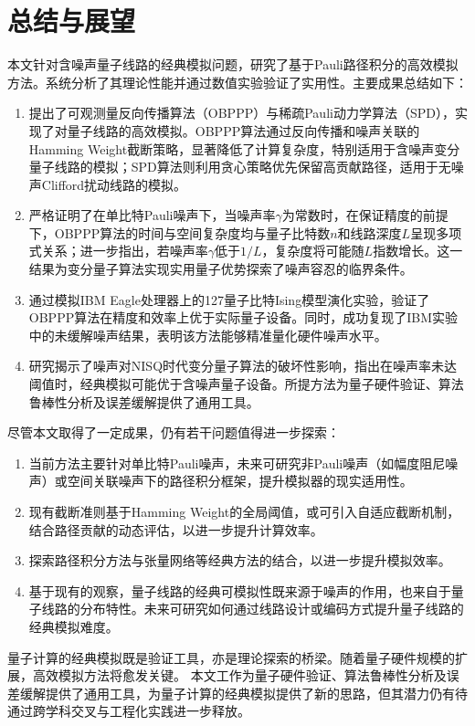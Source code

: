 \chapter{总结与展望}


本文针对含噪声量子线路的经典模拟问题，研究了基于Pauli路径积分的高效模拟方法。系统分析了其理论性能并通过数值实验验证了实用性。主要成果总结如下：
\begin{enumerate}
    \item 提出了可观测量反向传播算法（OBPPP）与稀疏Pauli动力学算法（SPD），实现了对量子线路的高效模拟。OBPPP算法通过反向传播和噪声关联的Hamming Weight截断策略，显著降低了计算复杂度，特别适用于含噪声变分量子线路的模拟；SPD算法则利用贪心策略优先保留高贡献路径，适用于无噪声Clifford扰动线路的模拟。
    \item 严格证明了在单比特Pauli噪声下，当噪声率$\gamma$为常数时，在保证精度的前提下，OBPPP算法的时间与空间复杂度均与量子比特数$n$和线路深度$L$呈现多项式关系；进一步指出，若噪声率$\gamma$低于$1/L$，复杂度将可能随$L$指数增长。这一结果为变分量子算法实现实用量子优势探索了噪声容忍的临界条件。
    \item 通过模拟IBM Eagle处理器上的127量子比特Ising模型演化实验，验证了OBPPP算法在精度和效率上优于实际量子设备。同时，成功复现了IBM实验中的未缓解噪声结果，表明该方法能够精准量化硬件噪声水平。
    \item 研究揭示了噪声对NISQ时代变分量子算法的破坏性影响，指出在噪声率未达阈值时，经典模拟可能优于含噪声量子设备。所提方法为量子硬件验证、算法鲁棒性分析及误差缓解提供了通用工具。
\end{enumerate}

尽管本文取得了一定成果，仍有若干问题值得进一步探索：
\begin{enumerate}
    \item 当前方法主要针对单比特Pauli噪声，未来可研究非Pauli噪声（如幅度阻尼噪声）或空间关联噪声下的路径积分框架，提升模拟器的现实适用性。
    \item 现有截断准则基于Hamming Weight的全局阈值，或可引入自适应截断机制，结合路径贡献的动态评估，以进一步提升计算效率。
    \item 探索路径积分方法与张量网络等经典方法的结合，以进一步提升模拟效率。
    \item 基于现有的观察，量子线路的经典可模拟性既来源于噪声的作用，也来自于量子线路的分布特性。未来可研究如何通过线路设计或编码方式提升量子线路的经典模拟难度。
\end{enumerate}

量子计算的经典模拟既是验证工具，亦是理论探索的桥梁。随着量子硬件规模的扩展，高效模拟方法将愈发关键。
本文工作为量子硬件验证、算法鲁棒性分析及误差缓解提供了通用工具，为量子计算的经典模拟提供了新的思路，但其潜力仍有待通过跨学科交叉与工程化实践进一步释放。